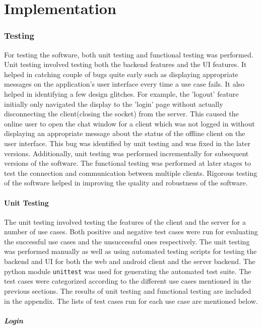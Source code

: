\documentclass[finalReport.tex]{subfiles}
\begin{document}
\chapter{Implementation}

\subsection{Testing}
For testing the software, both unit testing and functional testing was performed. Unit testing involved testing both the backend features and the UI features. It helped in catching couple of bugs quite early such as displaying appropriate messages on the application's user interface every time a use case fails. It also helped in identifying a few design glitches. For example, the 'logout' feature initially only navigated the display to the 'login' page without actually disconnecting the client(closing the socket) from the server. This caused the online user to open the chat window for a client which was not logged in without displaying an appropriate message about the status of the offline client on the user interface. This bug was identified by unit testing and was fixed in the later versions. Additionally, unit testing was performed incrementally for subsequent versions of the software. The functional testing was performed at later stages to test the connection and communication between multiple clients. Rigorous testing of the software helped in improving the quality and robustness of the software. 

\subsubsection{Unit Testing} 
The unit testing involved testing the features of the client and the server for a number of use cases. Both positive and negative test cases were run for evaluating the successful use cases and the unsuccessful ones respectively. The unit testing was performed manually as well as using automated testing scripts for testing the backend and UI for both the web and android client and the server backend. The python module \lstinline'unittest' was used for generating the automated test suite. The test cases were categorized according to the different use cases mentioned in the previous sections. The results of unit testing and functional testing are included in the appendix. The lists of test cases run for each use case are mentioned below.

\paragraph{Login} 
\end{document}
